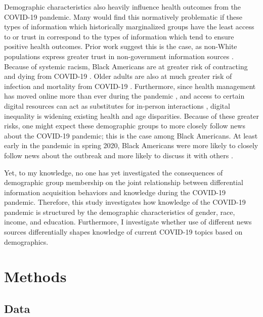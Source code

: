 \documentclass[11pt]{article}
\begin{document}
Demographic characteristics also heavily influence health outcomes from the COVID-19 pandemic. Many would find this normatively problematic if these types of information which historically marginalized groups have the least access to or trust in correspond to the types of information which tend to ensure positive health outcomes. Prior work suggest this is the case, as non-White populations express greater trust in non-government information sources \citep{Fridman2020}.
Because of systemic racism, Black Americans are at greater risk of contracting and dying from COVID-19 \citep{Adegunsoye2020,Kim2020,Millett2020,PriceHaywood2020}.
Older adults are also at much greater risk of infection and mortality from COVID-19 \citep{Ho2020,LeCouteur2020}.
Furthermore, since health management has moved online more than ever during the pandemic \citep{Khilnani2020}, and access to certain digital resources can act as substitutes for in-person interactions \citep{Robinson2020b}, digital inequality is widening existing health and age disparities.
Because of these greater risks, one might expect these demographic groups to more closely follow news about the COVID-19 pandemic; this is the case among Black Americans.
At least early in the pandemic in spring 2020, Black Americans were more likely to closely follow news about the outbreak and more likely to discuss it with others \citep{Mitchell2020b}.

Yet, to my knowledge, no one has yet investigated the consequences of demographic group membership on the joint relationship between differential information acquisition behaviors and knowledge during the COVID-19 pandemic. Therefore, this study investigates how knowledge of the COVID-19 pandemic is structured by the demographic characteristics of gender, race, income, and education. Furthermore, I investigate whether use of different news sources differentially shapes knowledge of current COVID-19 topics based on demographics.


\section{Methods}\label{sec:methods}

\subsection{Data}\label{sec:data}
\end{document}

